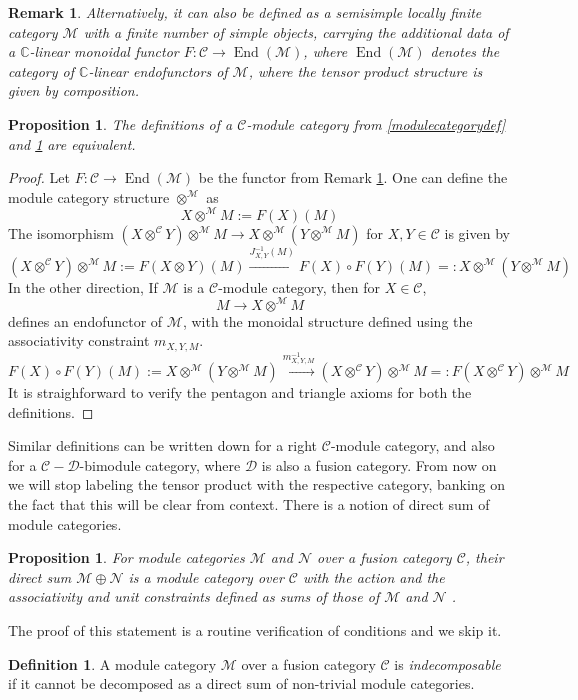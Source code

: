 \documentclass[a4paper, 10pt]{book}
\newtheorem{Prop}[theorem]{Proposition}
\newtheorem{Rem}[theorem]{Remark}
\theoremstyle{definition}
\newtheorem{Def}[theorem]{Definition}
\numberwithin{equation}{chapter}
\newcommand\End{\operatorname{End}}
\newcommand\inv{^{-1}}
\newcommand\kk{\mathbb C}
\newcommand\M{\mathcal{M}}
\newcommand\NN{\mathcal{N}}
\newcommand\C{\mathcal C}
\newcommand\D{\mathcal D}
\begin{document}
\begin{Rem}\label{modulecategorydefremark}\rm
Alternatively, it can also be defined as a semisimple locally finite category $\M$ with a finite number of simple objects, carrying the additional data of a $\kk$-linear monoidal functor $F:\C\rightarrow \End(\M)$, where $\End(\M)$ denotes the category of $\kk$-linear endofunctors of $\M$, where the tensor product structure is given by composition.
\end{Rem}
\begin{Prop}
The definitions of a $\C$-module category from \ref{modulecategorydef} and \ref{modulecategorydefremark} are equivalent.
\end{Prop}
\begin{proof}
Let $F:\C\rightarrow \End(\M)$ be the functor from Remark \ref{modulecategorydefremark}. One can define the module category structure $\otimes^{\M}$ as \begin{equation*}
	X\otimes^{\M} M := F(X)(M)
\end{equation*}
The isomorphism $(X\otimes^\C Y)\otimes^\M M\rightarrow X\otimes^\M (Y\otimes^\M M)$ for $X, Y \in \C$ is given by \begin{equation}\label{moddef2}
	(X\otimes^\C Y)\otimes^\M M := F(X\otimes Y)(M) \xrightarrow{J\inv_{X, Y}(M)} F(X)\circ F(Y)(M) =: X\otimes ^\M (Y\otimes^\M M )   
\end{equation}
In the other direction, If $\M$ is a $\C$-module category, then for $X\in \C$, \begin{equation*}
	M\rightarrow X\otimes^\M M
\end{equation*}
defines an endofunctor of $\M$, with the monoidal structure defined using the associativity constraint $m_{X, Y, M}$.
\begin{equation}\label{moddef1}
	F(X)\circ F(Y)(M):= X\otimes^\M (Y \otimes^\M M) \xrightarrow{m\inv_{X, Y, M}} (X\otimes^\C Y) \otimes^\M M=: F(X\otimes^\C Y) \otimes^\M M 
\end{equation} It is straighforward to verify the pentagon and triangle axioms for both the definitions.
\end{proof}
Similar definitions can be written down for a right $\C$-module category, and also for a $\C-\D$-bimodule category, where $\D$ is also a fusion category. From now on we will stop labeling the tensor product with the respective category, banking on the fact that this will be clear from context.
There is a notion of direct sum of module categories.
\begin{Prop}
For module categories $\M$ and $\NN$ over a fusion category $\C$, their \textit{direct sum} $\M\oplus\NN$ is a module category over $\C$ with the action and the associativity and unit constraints defined as sums of those of $\M$ and $\NN$ .
\end{Prop}
The proof of this statement is a routine verification of conditions and we skip it.
\begin{Def}
	A module category $\M$ over a fusion category $\C$ is \textit{indecomposable} if it cannot be decomposed as a direct sum of non-trivial module categories.
	\end{Def}	
\end{document}
